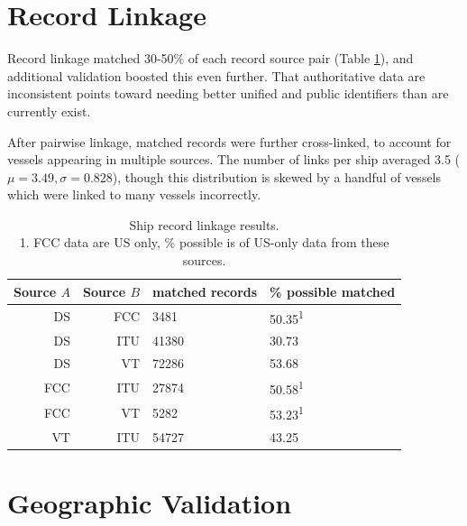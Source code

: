 \section{Record Linkage}

Record linkage matched 30-50\% of each record source pair (Table \ref{table:ships-record-linkage-results}), and additional validation boosted this even further. That authoritative data are inconsistent points toward needing better unified and public identifiers than are currently exist.

After pairwise linkage, matched records were further cross-linked, %
 to account for vessels appearing in multiple sources. The number of links per ship averaged 3.5 ($\mu = 3.49, \sigma = 0.828$), %
though this distribution is skewed by a handful of vessels which were linked to many vessels incorrectly. 
\begin{table}[htbp]
  \begin{tabular}{rrll} %
    \hline
    Source $A$ & Source $B$ & matched records & \% possible matched \\
    \hline
     DS & FCC &  3481 & 50.35\textsuperscript{1} \\
     DS & ITU & 41380 & 30.73 \\
     DS &  VT & 72286 & 53.68 \\
    FCC & ITU & 27874 & 50.58\textsuperscript{1} \\
    FCC &  VT &  5282 & 53.23\textsuperscript{1} \\
     VT & ITU & 54727 & 43.25 \\
  \end{tabular}
  \caption[Ship record linkage results]{Ship record linkage results. \\
    1. FCC data are US only, \% possible is of US-only data from these sources.}
  \label{table:ships-record-linkage-results}
\end{table}

\section{Geographic Validation}

